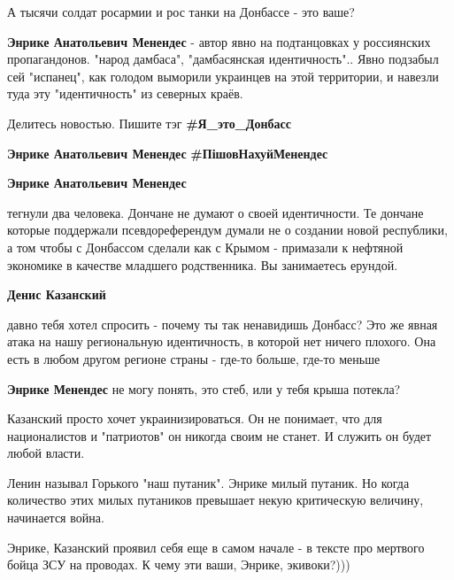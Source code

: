 \begin{itemize}
\begin{itemize}
А тысячи солдат росармии и рос танки на Донбассе - это ваше?

\textbf{Энрике Анатольевич Менендес} - автор явно на подтанцовках у россиянских пропагандонов. "народ дамбаса", "дамбасянская идентичность"..
Явно подзабыл сей "испанец", как голодом выморили украинцев на этой территории, и навезли туда эту "идентичность" из северных краёв.
\end{itemize} %


Делитесь новостью. Пишите тэг \textbf{\#Я\_это\_Донбасс}

\begin{itemize} %
\textbf{Энрике Анатольевич Менендес} \textbf{\#ПішовНахуйМенендес}

\textbf{Энрике Анатольевич Менендес} 

тегнули два человека. Дончане не думают о своей идентичности. Те дончане
которые поддержали псевдореферендум думали не о создании новой республики, а
том чтобы с Донбассом сделали как с Крымом - примазали к нефтяной экономике в
качестве младшего родственника. Вы занимаетесь ерундой.

\end{itemize} %

\textbf{Денис Казанский} 

давно тебя хотел спросить - почему ты так ненавидишь Донбасс? Это же явная
атака на нашу региональную идентичность, в которой нет ничего плохого. Она есть
в любом другом регионе страны - где-то больше, где-то меньше

\begin{itemize} %
\textbf{Энрике Менендес} не могу понять, это стеб, или у тебя крыша потекла?


Казанский просто хочет украинизироваться. Он не понимает, что для националистов
и "патриотов" он никогда своим не станет. И служить он будет любой власти.


Ленин называл Горького "наш путаник". Энрике милый путаник. Но когда количество
этих милых путаников превышает некую критическую величину, начинается война.


Энрике, Казанский проявил себя еще в самом начале - в тексте про мертвого бойца
ЗСУ на проводах. К чему эти ваши, Энрике, экивоки?)))


\end{itemize}
\end{itemize}
